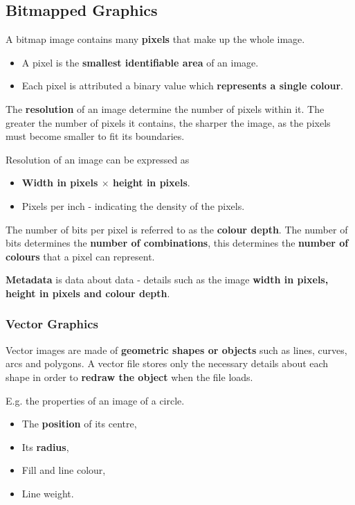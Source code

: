 \subsection{Bitmapped Graphics}

A bitmap image contains many \textbf{pixels} that make up the whole image.
\begin{itemize}
    \item A pixel is the \textbf{smallest identifiable area} of an image.
    \item Each pixel is attributed a binary value which \textbf{represents a single colour}.
\end{itemize}

The \textbf{resolution} of an image determine the number of pixels within it. The greater the number of pixels it contains, the sharper the image, as the pixels must become smaller to fit its boundaries.

Resolution of an image can be expressed as
\begin{itemize}
    \item \textbf{Width in pixels $\times$ height in pixels}.
    \item Pixels per inch - indicating the density of the pixels.
\end{itemize}

The number of bits per pixel is referred to as the \textbf{colour depth}. The number of bits determines the \textbf{number of combinations}, this determines the \textbf{number of colours} that a pixel can represent.

\textbf{Metadata} is data about data - details such as the image \textbf{width in pixels, height in pixels and colour depth}.

\subsubsection*{Vector Graphics}

Vector images are made of \textbf{geometric shapes or objects} such as lines, curves, arcs and polygons. A vector file stores only the necessary details about each shape in order to \textbf{redraw the object} when the file loads.

E.g. the properties of an image of a circle.
\begin{itemize}
    \item The \textbf{position} of its centre,
    \item Its \textbf{radius},
    \item Fill and line colour,
    \item Line weight.
\end{itemize}


